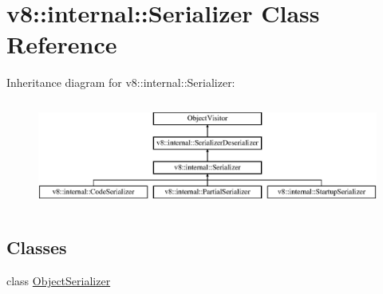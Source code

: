 \hypertarget{classv8_1_1internal_1_1_serializer}{}\section{v8\+:\+:internal\+:\+:Serializer Class Reference}
\label{classv8_1_1internal_1_1_serializer}
Inheritance diagram for v8\+:\+:internal\+:\+:Serializer\+:\begin{figure}[H]
\begin{center}
\leavevmode
\includegraphics[height=3.555556cm]{classv8_1_1internal_1_1_serializer}
\end{center}
\end{figure}
\subsection*{Classes}
\begin{DoxyCompactItemize}
\item 
class \hyperlink{classv8_1_1internal_1_1_serializer_1_1_object_serializer}{Object\+Serializer}
\end{DoxyCompactItemize}
